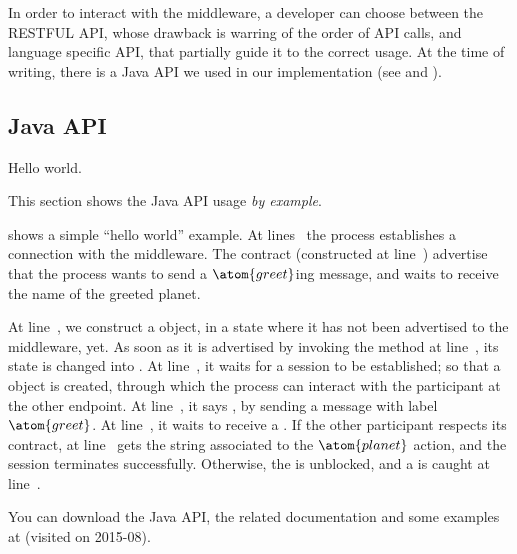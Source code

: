 In order to interact with the middleware, a developer can choose between the RESTFUL API, whose drawback is warring of the order of API calls, and language specific API, that partially guide it to the correct usage. At the time of writing, there is a Java API we used in our implementation (see  and ).

\subsection{Java API}\label{sec:co2-middleware-api}

\begin{listing}[t]
	\caption{Hello world.}
	\label{lst:hello-world}
\end{listing}

This section shows the Java API usage \textit{by example}. 

 shows a simple ``hello world'' example. %
At lines~ the process establishes 
a connection with the middleware. %
The contract (constructed at line~) advertise that the process wants to send a $\atom{greet}$ing message, and waits to receive the name of the greeted planet.

At line~, we construct a  object, in a state where it has not been advertised to the middleware, yet. %
As soon as it is advertised  by invoking the  
method  at line~, its state is changed into .
At line~, it waits for a session to be established; 
so that a  object is created, 
through which the process can interact with the participant at the other endpoint. 
At line~, it says , 
by sending a message with label $\atom{greet}$. %
%
At line~, it waits to receive a . %
If the other participant respects its contract,
 at line~ 
gets the string associated to the $\atom{planet}$ action,
and the session terminates successfully. %
Otherwise, the  is unblocked,
and a  is caught at line~.

You can download the Java API, the related documentation and some examples at  (visited on 2015-08).

